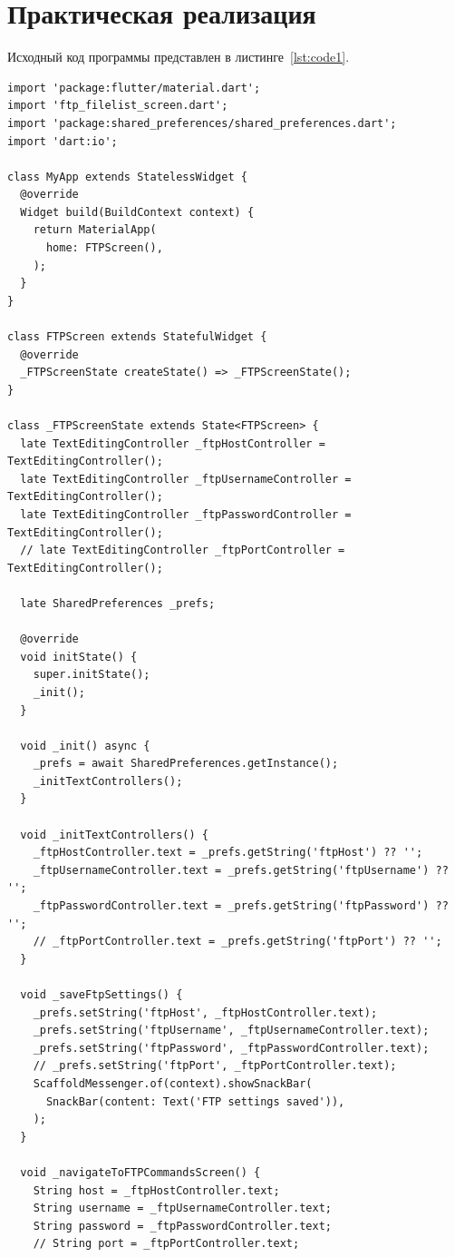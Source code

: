 \documentclass[a4paper, 14pt]{extarticle}
\begin{document}
\section{Практическая реализация}\label{Sect::code}

Исходный код программы представлен в листинге~\ref{lst:code1}.

\begin{lstlisting}[language={},caption={FTP-клиент,  SSH-клиент и SMTP-клиент},label={lst:code1}]
import 'package:flutter/material.dart';
import 'ftp_filelist_screen.dart';
import 'package:shared_preferences/shared_preferences.dart';
import 'dart:io';

class MyApp extends StatelessWidget {
  @override
  Widget build(BuildContext context) {
    return MaterialApp(
      home: FTPScreen(),
    );
  }
}

class FTPScreen extends StatefulWidget {
  @override
  _FTPScreenState createState() => _FTPScreenState();
}

class _FTPScreenState extends State<FTPScreen> {
  late TextEditingController _ftpHostController = TextEditingController();
  late TextEditingController _ftpUsernameController = TextEditingController();
  late TextEditingController _ftpPasswordController = TextEditingController();
  // late TextEditingController _ftpPortController = TextEditingController();

  late SharedPreferences _prefs;

  @override
  void initState() {
    super.initState();
    _init();
  }

  void _init() async {
    _prefs = await SharedPreferences.getInstance();
    _initTextControllers();
  }

  void _initTextControllers() {
    _ftpHostController.text = _prefs.getString('ftpHost') ?? '';
    _ftpUsernameController.text = _prefs.getString('ftpUsername') ?? '';
    _ftpPasswordController.text = _prefs.getString('ftpPassword') ?? '';
    // _ftpPortController.text = _prefs.getString('ftpPort') ?? '';
  }

  void _saveFtpSettings() {
    _prefs.setString('ftpHost', _ftpHostController.text);
    _prefs.setString('ftpUsername', _ftpUsernameController.text);
    _prefs.setString('ftpPassword', _ftpPasswordController.text);
    // _prefs.setString('ftpPort', _ftpPortController.text);
    ScaffoldMessenger.of(context).showSnackBar(
      SnackBar(content: Text('FTP settings saved')),
    );
  }

  void _navigateToFTPCommandsScreen() {
    String host = _ftpHostController.text;
    String username = _ftpUsernameController.text;
    String password = _ftpPasswordController.text;
    // String port = _ftpPortController.text;


\end{lstlisting}
\end{document}
